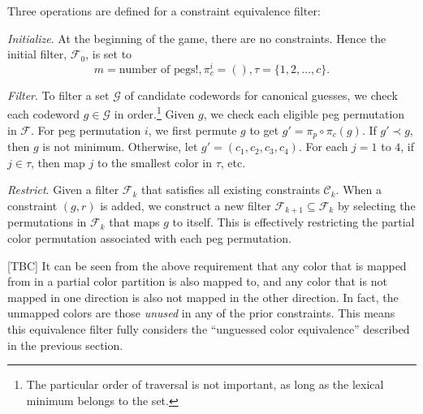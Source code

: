 Three operations are defined for a constraint equivalence filter:

\emph{Initialize}. At the beginning of the game, there are no constraints. Hence the initial filter, $\mathcal{F}_0$, is set to 
\[
m = \text{number of pegs}!, \pi_c^i = (), \tau = \{1, 2, \ldots, c \}.
\]

\emph{Filter}. To filter a set $\mathcal{G}$ of candidate codewords for canonical guesses, we check each codeword $g \in \mathcal{G}$ in order.\footnote{The particular order of traversal is not important, as long as the lexical minimum belongs to the set.} 
Given $g$, we check each eligible peg permutation in $\mathcal{F}$. For peg permutation $i$, we first permute $g$ to get $g' = \pi_p \circ \pi_c (g)$. If $g' \prec g$, then $g$ is not minimum. Otherwise, let $g' = (c_1, c_2, c_3, c_4)$. For each $j = 1$ to $4$, if $j \in \tau$, then map $j$ to the smallest color in $\tau$, etc.



\emph{Restrict}. Given a filter $\mathcal{F}_k$ that satisfies all existing constraints $\mathcal{C}_k$. When a constraint $(g, r)$ is added, we construct a new filter $\mathcal{F}_{k+1} \subseteq \mathcal{F}_k$ by selecting the permutations in $\mathcal{F}_k$ that maps $g$ to itself. This is effectively restricting the partial color permutation associated with each peg permutation.

[TBC] It can be seen from the above requirement that any color that is mapped from in a partial color partition is also mapped to, and any color that is not mapped in one direction is also not mapped in the other direction. In fact, the unmapped colors are those \emph{unused} in any of the prior constraints. This means this equivalence filter fully considers the ``unguessed color equivalence'' described in the previous section.


